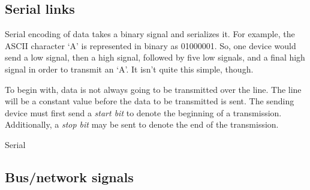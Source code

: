 \subsection{Serial links} %

Serial encoding of data takes a binary signal and serializes it. For example, the ASCII character `A' is represented in binary as 01000001. So, one device would send a low signal, then a high signal, followed by five low signals, and a final high signal in order to transmit an `A'. It isn't quite this simple, though.

To begin with, data is not always going to be transmitted over the line. The line will be a constant value before the data to be transmitted is sent. The sending device must first send a \textit{start bit} to denote the beginning of a transmission. Additionally, a \textit{stop bit} may be sent to denote the end of the transmission.

\begin{asparaenum}[a)]
\item Serial 
\end{asparaenum}

\subsection{Bus/network signals} %

